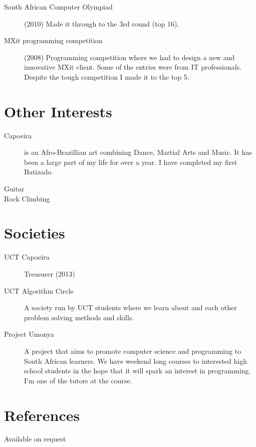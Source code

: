 \documentclass[margin,line,a4paper]{resume}
\begin{document}
\begin{resume}
\begin{description}
                \item [South African Computer Olympiad] (2010) Made it through to the 3rd
                round (top 16).

                \item [MXit programming competition] (2008) Programming competition where we
                had to design a new and innovative MXit client.  Some of the
                entries were from IT professionals. Despite the tough competition I made it to the top 5.
            \end{description}

        \section{\mysidestyle Other Interests}
            \begin{description}
                \item[Capoeira] is an Afro-Brazillian art combining Dance, Martial Arts and Music. It has
                    been a large part of my life for over a year. I have completed my first Batizado.
                \item[Guitar]
                \item[Rock Climbing]
            \end{description}

        \section{\mysidestyle Societies}
            \begin{description}
                \item [UCT Capoeira] Treasurer (2013)
                \item [UCT Algorithm Circle] A society run by UCT students where we learn about and
                each other problem solving methods and skills.

                \item [Project Umonya] A project that aims to promote computer science and programming
                to South African learners. We have weekend long courses to interested high school students
                in the hope that it will spark an interest in programming. I'm one of the tutors at the course.
            \end{description}

        \section{\mysidestyle References}
            Available on request
    \end{resume}
\end{document}
